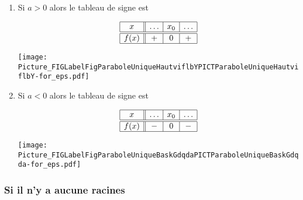 \begin{Aretenir}
\begin{enumerate}
    \item
        Si \( a>0\) alors le tableau de signe est
        \begin{multicols}{2}

            \begin{equation*}
                \begin{array}[h]{|c||c|c|c|}
                    \hline
                    x&\ldots&x_0&\ldots\\
                    \hline\hline
                    f(x)&+&0&+\\
                    \hline
                \end{array}
            \end{equation*}
            
            \columnbreak

\texttt{[image: Picture\_FIGLabelFigParaboleUniqueHautviflbYPICTParaboleUniqueHautviflbY-for\_eps.pdf]}

        \end{multicols}
    \item
        Si \( a<0\) alors le tableau de signe est
        \begin{multicols}{2}

            \begin{equation*}
                \begin{array}[h]{|c||c|c|c|}
                    \hline
                    x&\ldots&x_0&\ldots\\
                    \hline\hline
                    f(x)&-&0&-\\
                    \hline
                \end{array}
            \end{equation*}
            
            \columnbreak
\texttt{[image: Picture\_FIGLabelFigParaboleUniqueBaskGdqdaPICTParaboleUniqueBaskGdqda-for\_eps.pdf]}

        \end{multicols}
        
\end{enumerate}
\end{Aretenir}

\subsubsection{Si il n'y a aucune racines}

